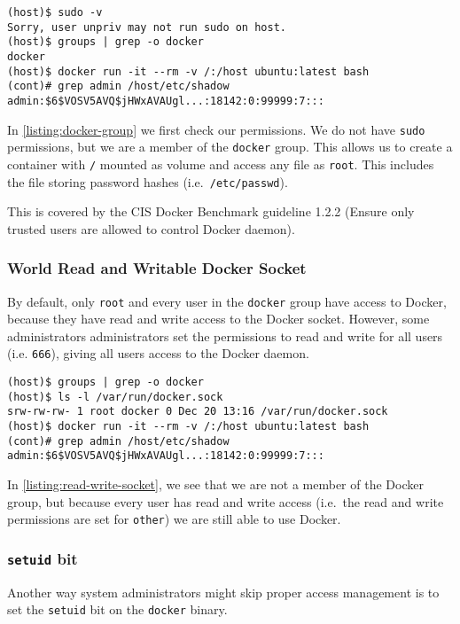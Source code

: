 \begin{lstlisting}[caption={Docker \lstinline{group} exploit example.},captionpos=b,label={listing:docker-group}]
(host)$ sudo -v
Sorry, user unpriv may not run sudo on host.
(host)$ groups | grep -o docker
docker
(host)$ docker run -it --rm -v /:/host ubuntu:latest bash
(cont)# grep admin /host/etc/shadow
admin:$6$VOSV5AVQ$jHWxAVAUgl...:18142:0:99999:7:::
\end{lstlisting}

In \autoref{listing:docker-group} we first check our permissions. We do not have \lstinline{sudo} permissions, but we are a member of the \lstinline{docker} group. This allows us to create a container with \lstinline{/} mounted as volume and access any file as \lstinline{root}. This includes the file storing password hashes (i.e.\ \lstinline{/etc/passwd}).

\medskip

This is covered by the CIS Docker Benchmark guideline 1.2.2 (Ensure only trusted users are allowed to control Docker daemon).

\subsubsection{World Read and Writable Docker Socket}
By default, only \lstinline{root} and every user in the \lstinline{docker} group have access to Docker, because they have read and write access to the Docker socket. However, some administrators administrators set the permissions to read and write for all users (i.e. \lstinline{666}), giving all users access to the Docker daemon.

\begin{lstlisting}[caption={All users can use Docker if they have read and write access to the Socket},captionpos=b,label={listing:read-write-socket}]
(host)$ groups | grep -o docker
(host)$ ls -l /var/run/docker.sock
srw-rw-rw- 1 root docker 0 Dec 20 13:16 /var/run/docker.sock
(host)$ docker run -it --rm -v /:/host ubuntu:latest bash
(cont)# grep admin /host/etc/shadow
admin:$6$VOSV5AVQ$jHWxAVAUgl...:18142:0:99999:7:::
\end{lstlisting}

In \autoref{listing:read-write-socket}, we see that we are not a member of the Docker group, but because every user has read and write access (i.e.\ the read and write permissions are set for \lstinline{other}) we are still able to use Docker.

\subsubsection{\texorpdfstring{\lstinline{setuid}}{setuid} bit}\label{subsubsection:setuid}
Another way system administrators might skip proper access management is to set the \lstinline{setuid} bit on the \lstinline{docker} binary.

